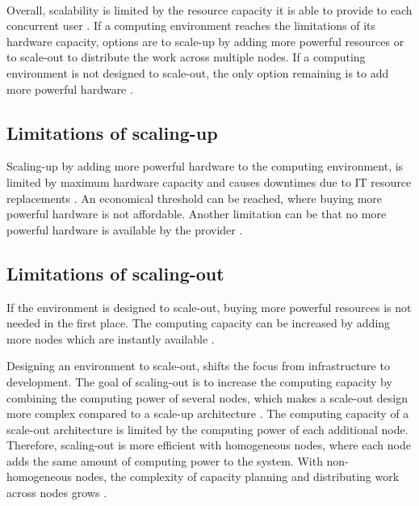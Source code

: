 \documentclass{article}
\begin{document}
\paragraph{}
Overall, scalability is limited by the resource capacity it is able to provide to each concurrent user \cite{Wilder2012CloudPatterns}.
If a computing environment reaches the limitations of its hardware capacity, options are to scale-up by adding more powerful resources or to scale-out to distribute the work across multiple nodes. If a computing environment is not designed to scale-out, the only option remaining is to add more powerful hardware \cite{Abbot2011ScalabilityRules}.


\subsection{Limitations of scaling-up}
Scaling-up by adding more powerful hardware to the computing environment, is limited by maximum hardware capacity and causes downtimes due to IT resource replacements \cite{Mahmood2013CloudConcepts}. An economical threshold can be reached, where buying more powerful hardware is not affordable. Another limitation can be that no more powerful hardware is available by the provider \cite{Abbot2011ScalabilityRules, Wilder2012CloudPatterns}.


\subsection{Limitations of scaling-out}
If the environment is designed to scale-out, buying more powerful resources is not needed in the first place. The computing capacity can be increased by adding more nodes which are instantly available \cite{Abbot2011ScalabilityRules}.


Designing an environment to scale-out, shifts the focus from infrastructure to development. The goal of scaling-out is to increase the computing capacity by combining the computing power of several nodes, which makes a scale-out design more complex compared to a scale-up architecture \cite{Wilder2012CloudPatterns}. The computing capacity of a scale-out architecture is limited by the computing power of each additional node. Therefore, scaling-out is more efficient with homogeneous nodes, where each node adds the same amount of computing power to the system. With non-homogeneous nodes, the complexity of capacity planning and distributing work across nodes grows \cite{Wilder2012CloudPatterns}. 
\end{document}
